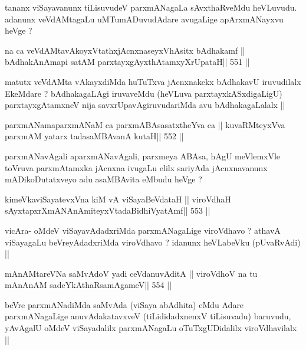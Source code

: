 \begin{artha}
tananx viSayavanunx tiLisuvudeV parxmANagaLa sAvxthaRveMdu heVLuvudu.
adanunx veVdAMtagaLu uMTumADuvudAdare avugaLige apArxmANayxvu heVge ?
\end{artha}

\begin{shl}
na ca veVdAMtavAkoyxVtathxjAcnxnaseyxVhAsitx bAdhakamf ||
bAdhakAnAmapi satAM parxtayxgAyxthAtamxyXrUpataH\hfill || 551 ||
\end{shl}

\begin{artha}
matutx veVdAMta vAkayxdiMda huTuTxva jAcnxnakekx bAdhakavU iruvudilalx EkeMdare ? bAdhakagaLAgi iruvaveMdu (heVLuva parxtayxkASxdigaLigU)
parxtayxgAtamxneV nija savxrUpavAgiruvudariMda avu bAdhakagaLalalx ||
\end{artha}

\begin{shl}
parxmANamaparxmANaM ca parxmABAsasatxtheYva ca ||
kuvaRMteyxVva parxmAM yatarx tadasaMBAvanA kutaH\hfill || 552 ||
\end{shl}

\begin{artha}
parxmANavAgali aparxmANavAgali, parxmeya ABAsa, hAgU meVlemxVle
toVruva parxmAtamxka jAcnxna ivugaLu elilx sariyAda jAcnxnavanunx
mADikoDutatxveyo adu asaMBAvita eMbudu heVge ? 
\end{artha}

\begin{shl}
kimeVkaviSayatevxVna kiM vA viSayaBeVdataH ||
viroVdhaH sAyxtapxrXmANAnAmiteyxVtadaBidhiVyatAmf\hfill || 553 ||
\end{shl}

\begin{artha}
vicAra- oMdeV viSayavAdadxriMda parxmANagaLige viroVdhavo ? athavA
viSayagaLu beVreyAdadxriMda viroVdhavo ? idanunx heVLabeVku
(pUvaRvAdi) ||
\end{artha}


\begin{shl}
mAnAMtareVNa saMvAdoV yadi ceVdanuvAditA ||
viroVdhoV na tu mAnAnAM sadeYkAthaRsamAgameV\hfill || 554 ||
\end{shl}

\begin{artha}
beVre parxmANadiMda saMvAda (viSaya abAdhita) eMdu Adare
parxmANagaLige anuvAdakatavxveV (tiLididadxnenxV tiLisuvadu) baruvudu,
yAvAgalU oMdeV viSayadalilx parxmANagaLu oTuTxgUDidalilx
viroVdhavilalx ||
\end{artha}

